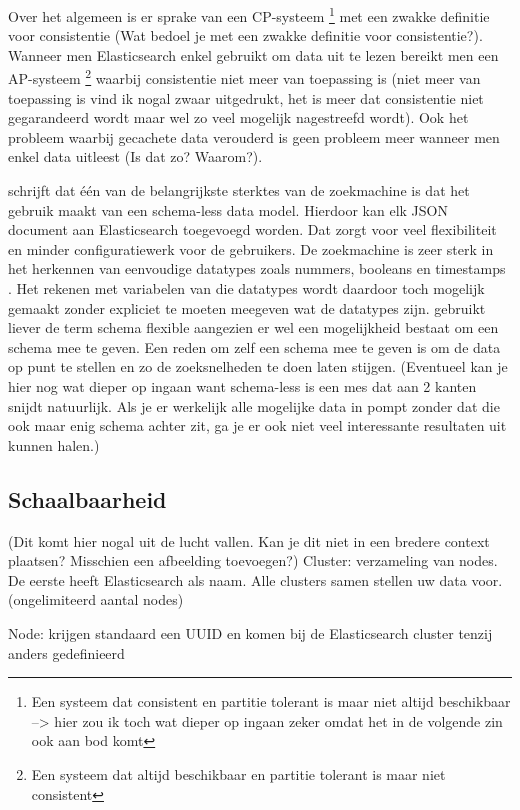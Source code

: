 {Over het algemeen is er sprake van een CP-systeem \footnote{Een systeem dat consistent en partitie tolerant is maar niet altijd beschikbaar --> hier zou ik toch wat dieper op ingaan zeker omdat het in de volgende zin ook aan bod komt} met een zwakke definitie voor consistentie (Wat bedoel je met een zwakke definitie voor consistentie?). Wanneer men Elasticsearch enkel gebruikt om data uit te lezen bereikt men een AP-systeem \footnote{Een systeem dat altijd beschikbaar en partitie tolerant is maar niet consistent} waarbij consistentie niet meer van toepassing is (niet meer van toepassing is vind ik nogal zwaar uitgedrukt, het is meer dat consistentie niet gegarandeerd wordt maar wel zo veel mogelijk nagestreefd wordt). Ook het probleem waarbij gecachete data verouderd is geen probleem meer wanneer men enkel data uitleest (Is dat zo? Waarom?).

\textcite{Gausser2012} schrijft dat één van de belangrijkste sterktes van de zoekmachine is dat het gebruik maakt van een schema-less data model. Hierdoor kan elk JSON document aan Elasticsearch toegevoegd worden. Dat zorgt voor veel flexibiliteit en minder configuratiewerk voor de gebruikers. De zoekmachine is zeer sterk in het herkennen van eenvoudige datatypes zoals nummers, booleans en timestamps \autocite{Brasetvik2013s}. Het rekenen met variabelen van die datatypes wordt daardoor toch mogelijk gemaakt zonder expliciet te moeten meegeven wat de datatypes zijn. \textcite{Brasetvik2013s} gebruikt liever de term schema flexible aangezien er wel een mogelijkheid bestaat om een schema mee te geven. Een reden om zelf een schema mee te geven is om de data op punt te stellen en zo de zoeksnelheden te doen laten stijgen. (Eventueel kan je hier nog wat dieper op ingaan want schema-less is een mes dat aan 2 kanten snijdt natuurlijk. Als je er werkelijk alle mogelijke data in pompt zonder dat die ook maar enig schema achter zit, ga je er ook niet veel interessante resultaten uit kunnen halen.)

\subsection{Schaalbaarheid}
(Dit komt hier nogal uit de lucht vallen. Kan je dit niet in een bredere context plaatsen? Misschien een afbeelding toevoegen?)
 Cluster: verzameling van nodes. De eerste heeft Elasticsearch als naam. Alle clusters samen stellen uw data voor. (ongelimiteerd aantal nodes) 

Node: krijgen standaard een UUID en komen bij de Elasticsearch cluster tenzij anders gedefinieerd 

}
